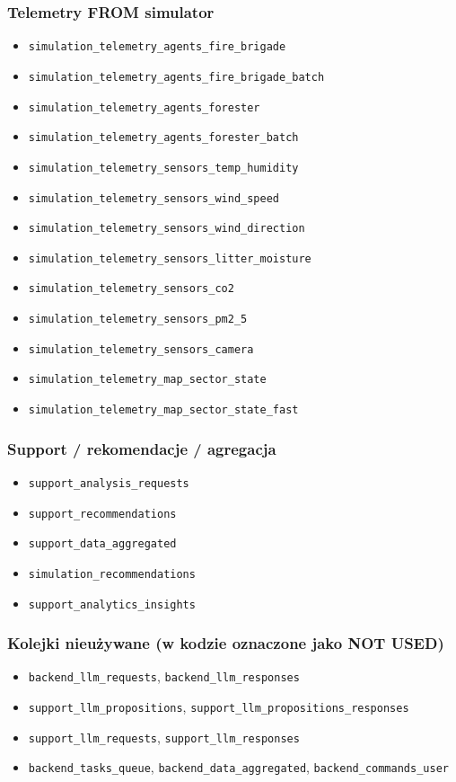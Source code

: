 \documentclass[11pt,a4paper] {article}
\begin{document}
\subsubsection{Telemetry FROM simulator}
\begin{itemize}
  \item \texttt{simulation\_telemetry\_agents\_fire\_brigade}
  \item \texttt{simulation\_telemetry\_agents\_fire\_brigade\_batch}
  \item \texttt{simulation\_telemetry\_agents\_forester}
  \item \texttt{simulation\_telemetry\_agents\_forester\_batch}
  \item \texttt{simulation\_telemetry\_sensors\_temp\_humidity}
  \item \texttt{simulation\_telemetry\_sensors\_wind\_speed}
  \item \texttt{simulation\_telemetry\_sensors\_wind\_direction}
  \item \texttt{simulation\_telemetry\_sensors\_litter\_moisture}
  \item \texttt{simulation\_telemetry\_sensors\_co2}
  \item \texttt{simulation\_telemetry\_sensors\_pm2\_5}
  \item \texttt{simulation\_telemetry\_sensors\_camera}
  \item \texttt{simulation\_telemetry\_map\_sector\_state}
  \item \texttt{simulation\_telemetry\_map\_sector\_state\_fast}
\end{itemize}

\subsubsection{Support / rekomendacje / agregacja}
\begin{itemize}
  \item \texttt{support\_analysis\_requests}
  \item \texttt{support\_recommendations}
  \item \texttt{support\_data\_aggregated}
  \item \texttt{simulation\_recommendations}
  \item \texttt{support\_analytics\_insights}
\end{itemize}

\subsubsection{Kolejki nieużywane (w kodzie oznaczone jako NOT USED)}
\begin{itemize}
  \item \texttt{backend\_llm\_requests}, \texttt{backend\_llm\_responses}
  \item \texttt{support\_llm\_propositions}, \texttt{support\_llm\_propositions\_responses}
  \item \texttt{support\_llm\_requests}, \texttt{support\_llm\_responses}
  \item \texttt{backend\_tasks\_queue}, \texttt{backend\_data\_aggregated}, \texttt{backend\_commands\_user}
\end{itemize}
\end{document}
